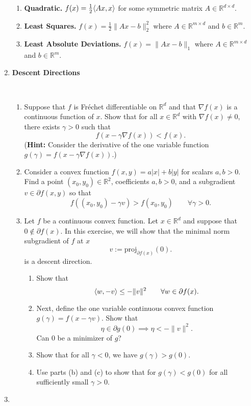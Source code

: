 \documentclass[12pt]{article}
\numberwithin{equation}{section}
\newcommand{\RR}{\mathbb{R}}
\newcommand{\proj}{\mathrm{proj}}
\theoremstyle{remark}
\DeclarePairedDelimiter{\dotp}{\langle}{\rangle}
\begin{document}
\begin{enumerate}
{\begin{enumerate}[noitemsep]
\item {\bf Quadratic.} $f(x) = \frac{1}{2} \dotp{Ax, x}$ for some symmetric matrix $A \in \RR^{d\times d}$. 
\item {\bf Least Squares.} $f(x) = \frac{1}{2} \|Ax- b\|_2^2$ where $A \in \RR^{m \times d}$ and $b \in \RR^m$.
\item {\bf Least Absolute Deviations.} $f(x) = \|Ax- b\|_1$ where $A \in \RR^{m \times d}$ and $b \in \RR^m$.
\end{enumerate}
}

\item {\bf Descent Directions} {\rm  
~
\begin{enumerate}
\item \Coffeecup Suppose that $f$ is Fr{\'e}chet differentiable on $\RR^d$ and that $\nabla f(x)$ is a continuous function of $x$. Show that for all $x \in \RR^d$ with $\nabla f(x) \neq 0$, there exists $\gamma > 0$ such that 
$$
f(x - \gamma \nabla f(x)) < f(x).
$$
({\bf Hint:} Consider the derivative of the one variable function $g(\gamma) = f(x - \gamma \nabla f(x))$.)
\item Consider a convex function $f(x, y) = a|x| + b|y|$ for scalars $a, b > 0$. Find a point $(x_0, y_0) \in \RR^2$, coefficients $a, b > 0$, and a subgradient $v \in \partial f(x, y)$ so that 
$$
f((x_0, y_0) - \gamma v) > f(x_0, y_0) \qquad \forall \gamma > 0.
$$
\item \Coffeecup\Coffeecup Let $f$ be a continuous convex function. Let $x \in \RR^d$ and suppose that $ 0 \notin \partial f(x)$. In this exercise, we will show that the minimal norm subgradient of $f$ at $x$ 
$$
v := \proj_{\partial f(x)}(0). 
$$
is a descent direction. 
\begin{enumerate}
\item  
Show that 
$$
\dotp{w, -v} \leq -\|v\|^2 \qquad \forall w \in \partial f(x). 
$$
\item Next, define the one variable continuous convex function $g(\gamma) = f(x - \gamma v)$. Show that 
$$
\eta \in \partial g(0) \implies \eta < - \|v\|^2.
$$
Can $0$ be a minimizer of $g$? 
\item Show that for all $\gamma < 0$, we have $g(\gamma) > g(0)$. 
\item Use parts (b) and (c) to show that for $g(\gamma) < g(0)$ for all sufficiently small $\gamma > 0$.  
\end{enumerate}
\end{enumerate}
}
\item {\rm 
}
\end{enumerate}
\end{document}

